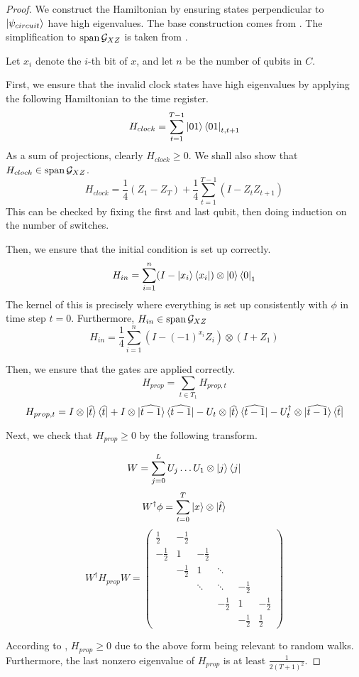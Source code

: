 \begin{proof}
	We construct the Hamiltonian by ensuring states perpendicular to $\ket{\psi_{circuit}}$ have high eigenvalues. The base construction comes from \cite{kitaev2002classical}. The simplification to $\operatorname*{\operatorname{span}}\mathcal{G}_{XZ}$ is taken from \cite{PhysRevA.78.012352}.

Let $x_i$ denote the $i$-th bit of $x$, and let $n$ be the number of qubits in $C$.

First, we ensure that the invalid clock states have high eigenvalues by applying the following Hamiltonian to the time register.
$$H_{clock}=\sum_{t=1}^{T-1}\ket{01}\bra{01}_{t,t+1}$$
As a sum of projections, clearly $H_{clock}\geq 0$. We shall also show that $H_{clock}\in\operatorname*{\operatorname{span}}\mathcal{G}_{XZ}$.
$$H_{clock}=\frac{1}{4}(Z_1 - Z_T) + \frac{1}{4}\sum_{t=1}^{T-1}(I-Z_tZ_{t+1}) $$
This can be checked by fixing the first and last qubit, then doing induction on the number of switches.

Then, we ensure that the initial condition is set up correctly.
$$H_{in}=\sum_{i=1}^n(I-\ket{x_i}\bra{x_i})\otimes\ket{0}\bra{0}_1$$
The kernel of this is precisely where everything is set up consistently with $\phi$ in time step $t=0$. Furthermore, $H_{in}\in\operatorname*{\operatorname{span}}\mathcal{G}_{XZ}$
$$H_{in}=\frac{1}{4}\sum_{i=1}^n(I-(-1)^{x_i}Z_i)\otimes(I+Z_1)$$

Then, we ensure that the gates are applied correctly.
$$H_{prop}=\sum_{t\in T_1}H_{prop,t}$$
$$H_{prop,t}=I\otimes\ket{\widehat{t}}\bra{\widehat{t}}
	+I\otimes\ket{\widehat{t-1}}\bra{\widehat{t-1}}
	-U_t\otimes\ket{\widehat{t}}\bra{\widehat{t-1}}
	-U_t^\dagger\otimes\ket{\widehat{t-1}}\bra{\widehat{t}}$$

Next, we check that $H_{prop}\geq0$ by the following transform.

$$W=\sum_{j=0}^L U_j\ldots U_1\otimes\ket{j}\bra{j}$$
$$W^\dagger\phi=\sum_{t=0}^T\ket{x}\otimes\ket{\hat{t}}$$
$$W^\dagger H_{prop} W=
\begin{pmatrix}
	\frac{1}{2} & -\frac{1}{2} & & & &  \\
	-\frac{1}{2} & 1 & -\frac{1}{2} & & & \\
	& -\frac{1}{2} & 1 & \ddots & & \\
	& & \ddots & \ddots & -\frac{1}{2} & \\
	& & & -\frac{1}{2} & 1 & -\frac{1}{2} \\
	& & & & -\frac{1}{2} & \frac{1}{2}
\end{pmatrix}$$

According to \cite{2002quant.ph.10077A}, $H_{prop}\geq 0$ due to the above form being relevant to random walks. Furthermore, the last nonzero eigenvalue of $H_{prop}$ is at least $\frac{1}{2(T+1)^2}$.


\end{proof}
